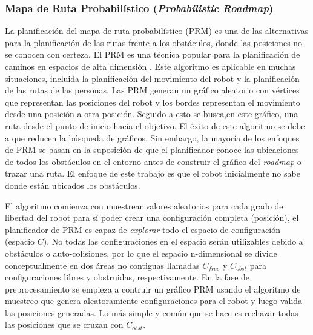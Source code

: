 \subsubsection{Mapa de Ruta Probabil\'istico (\textit{Probabilistic Roadmap})}

La planificaci\'on del mapa de ruta probabil\'istico (PRM) es una de las 
alternativas para la planificaci\'on de las rutas frente a los  
obst\'aculos, donde las posiciones no se conocen con certeza. El PRM es una 
t\'ecnica popular para la planificaci\'on de caminos en espacios de alta 
dimensi\'on \cite{guibas1999probabilistic}. Este algoritmo es aplicable 
en muchas situaciones, incluida la planificaci\'on del movimiento del 
robot y la planificaci\'on de las rutas de las personas. Las PRM generan 
un gr\'afico aleatorio con v\'ertices que representan las posiciones del 
robot y los bordes representan el movimiento desde una posici\'on a otra 
posici\'on. Seguido a esto se busca,en este gr\'afico, una ruta desde el 
punto de inicio hacia el objetivo. El \'exito de este algoritmo se debe 
a que reducen la b\'usqueda de gr\'aficos. Sin embargo, la mayor\'ia de 
los enfoques de PRM se basan en la suposici\'on de que el planificador 
conoce las ubicaciones de todos los obst\'aculos en el entorno antes de 
construir el gr\'afico del \textit{roadmap} o trazar una ruta. El enfoque 
de este trabajo es que el robot inicialmente no sabe donde est\'an 
ubicados los obst\'aculos.

El algoritmo comienza con muestrear valores aleatorios para cada grado de 
libertad del robot para s\'i poder crear una configuraci\'on completa 
(posici\'on), el planificador de PRM es capaz de \textit{explorar} todo 
el espacio de configuraci\'on (espacio $C$). No todas las configuraciones 
en el espacio ser\'an utilizables debido a obst\'aculos o auto-colisiones, 
por lo que el espacio n-dimensional se divide conceptualmente en dos \'areas 
no contiguas llamadas $C_{free}$ y $C_{obst}$ para configuraciones libres y 
obstruidas, respectivamente. En la fase de preprocesamiento se empieza a 
contruir un gr\'afico PRM usando el algoritmo de muestreo que genera 
aleatoramiente configuraciones para el robot y luego valida las 
posiciones generadas. Lo m\'as simple y com\'un que se hace es rechazar 
todas las posiciones que se cruzan con $C_{obst}$. 


